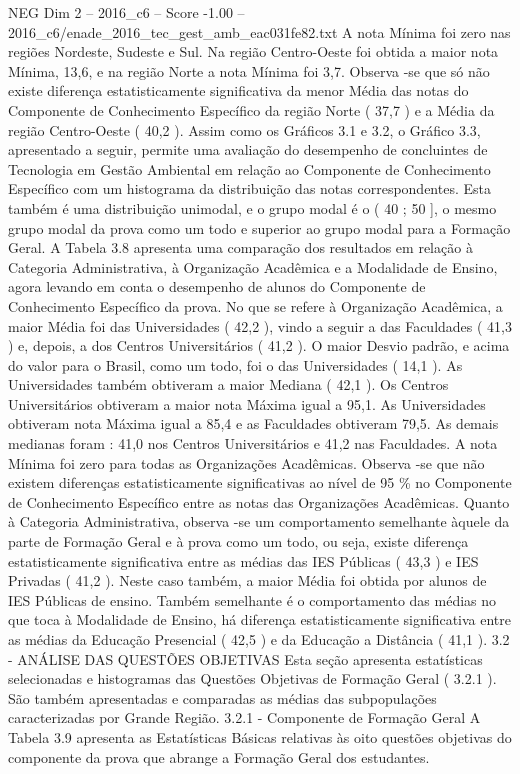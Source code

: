 \begin{textsample}{NEG Dim 2 – 2016\_c6 – Score -1.00 – 2016\_c6/enade\_2016\_tec\_gest\_amb\_eac031fe82.txt}
A nota Mínima foi zero nas regiões Nordeste, Sudeste e Sul.
Na região Centro-Oeste foi obtida a maior nota Mínima, 13,6, e na região Norte a nota Mínima foi 3,7.
Observa -se que só não existe diferença estatisticamente significativa da menor Média das notas do Componente de Conhecimento Específico da região Norte ( 37,7 ) e a Média da região Centro-Oeste ( 40,2 ).
Assim como os Gráficos 3.1 e 3.2, o Gráfico 3.3, apresentado a seguir, permite uma avaliação do desempenho de concluintes de Tecnologia em Gestão Ambiental em relação ao Componente de Conhecimento Específico com um histograma da distribuição das notas correspondentes.
Esta também é uma distribuição unimodal, e o grupo modal é o ( 40 ; 50 ], o mesmo grupo modal da prova como um todo e superior ao grupo modal para a Formação Geral.
A Tabela 3.8 apresenta uma comparação dos resultados em relação à Categoria Administrativa, à Organização Acadêmica e a Modalidade de Ensino, agora levando em conta o desempenho de alunos do Componente de Conhecimento Específico da prova.
No que se refere à Organização Acadêmica, a maior Média foi das Universidades ( 42,2 ), vindo a seguir a das Faculdades ( 41,3 ) e, depois, a dos Centros Universitários ( 41,2 ).
O maior Desvio padrão, e acima do valor para o Brasil, como um todo, foi o das Universidades ( 14,1 ).
As Universidades também obtiveram a maior Mediana ( 42,1 ).
Os Centros Universitários obtiveram a maior nota Máxima igual a 95,1.
As Universidades obtiveram nota Máxima igual a 85,4 e as Faculdades obtiveram 79,5.
As demais medianas foram : 41,0 nos Centros Universitários e 41,2 nas Faculdades.
A nota Mínima foi zero para todas as Organizações Acadêmicas.
Observa -se que não existem diferenças estatisticamente significativas ao nível de 95 \% no Componente de Conhecimento Específico entre as notas das Organizações Acadêmicas.
Quanto à Categoria Administrativa, observa -se um comportamento semelhante àquele da parte de Formação Geral e à prova como um todo, ou seja, existe diferença estatisticamente significativa entre as médias das IES Públicas ( 43,3 ) e IES Privadas ( 41,2 ).
Neste caso também, a maior Média foi obtida por alunos de IES Públicas de ensino.
Também semelhante é o comportamento das médias no que toca à Modalidade de Ensino, há diferença estatisticamente significativa entre as médias da Educação Presencial ( 42,5 ) e da Educação a Distância ( 41,1 ). 3.2 - ANÁLISE DAS QUESTÕES OBJETIVAS Esta seção apresenta estatísticas selecionadas e histogramas das Questões Objetivas de Formação Geral ( 3.2.1 ).
São também apresentadas e comparadas as médias das subpopulações caracterizadas por Grande Região. 3.2.1 - Componente de Formação Geral A Tabela 3.9 apresenta as Estatísticas Básicas relativas às oito questões objetivas do componente da prova que abrange a Formação Geral dos estudantes.

\end{textsample}
